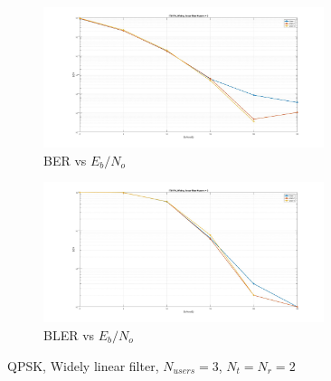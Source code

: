 \documentclass[12pt,a4paper,notitlepage,twoside,headsepline]{scrartcl}
\begin{document}
\begin{figure}
\centering
\begin{subfigure}{.5\textwidth}
  \centering
  \includegraphics[width=0.9\textwidth]{figures/Wl_nu3_ber}
  \caption{BER vs $E_b/N_o$} 
  \label{fig:example}
\end{subfigure}%
\begin{subfigure}{.5\textwidth}
  \centering
  \includegraphics[width=0.9\textwidth]{figures/Wl_nu3_bler}
  \caption{BLER vs $E_b/N_o$}
  \label{fig:example}
\end{subfigure}
\caption{QPSK, Widely linear filter, $N_{users} = 3$, $N_t = N_r = 2$}
\label{fig:test}
\end{figure}
\end{document}
